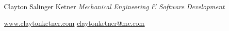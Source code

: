 \begin{minipage}{0.7\textwidth}
    \raggedright  %
    \begingroup
        \fontsize{30 pt}{0}\selectfont
        Clayton Salinger Ketner
    \endgroup
    \break
    \begingroup
        \color{accentColor}
        \textit{Mechanical Engineering \& Software Development}
    \endgroup
\end{minipage}%
\begin{minipage}[c]{0.3\textwidth}
    \begin{flushright}
        \href{http://www.claytonketner.com}{www.claytonketner.com}%
        \newlength{\textOffset}%
        \settowidth{\textOffset}{@me}%
        \hspace{\textOffset}%
        \break
        \href{mailto:claytonketner@me.com}{claytonketner@me.com}
    \end{flushright}
\end{minipage}
\\
\vspace{0.1cm}
\\
